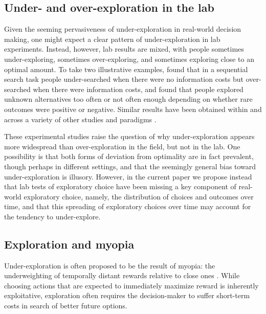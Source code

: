 \documentclass[10pt,letterpaper]{article}
\begin{document}
\subsection{Under- and over-exploration in the lab}

Given the seeming pervasiveness of under-exploration in real-world decision
making, one might expect a clear pattern of under-exploration in lab
experiments. Instead, however, lab results are mixed, with people sometimes
under-exploring, sometimes over-exploring, and sometimes exploring close to an
optimal amount. To take two illustrative examples, \citet{Zwick2003} found that
in a sequential search task people under-searched when there were no information
costs but over-searched when there were information costs, and
\citet{Teodorescu2014} found that people explored unknown alternatives too often
or not often enough depending on whether rare outcomes were positive or
negative. Similar results have been obtained within and across a variety of
other studies and paradigms
\citep{tversky1966information, Busemeyer1988, hertwig2004decisions, Navarro2016, Juni2016, Sang2011}.

These experimental studies raise the question of why under-exploration appears
more widespread than over-exploration in the field, but not in the lab. One
possibility is that both forms of deviation from optimality are in fact
prevalent, though perhaps in different settings, and that the seemingly general bias
toward under-exploration is illusory. However, in the current paper we propose
instead that lab tests of exploratory choice have been missing a key component
of real-world exploratory choice, namely, the distribution of choices and
outcomes over time, and that this spreading of exploratory choices over time may
account for the tendency to under-explore.


\subsection{Exploration and myopia}

Under-exploration is often proposed to be the result of myopia: the
underweighting of temporally distant rewards relative to close ones \cite{March1991, Levinthal1993}. While
choosing actions that are expected to immediately maximize reward is inherently
exploitative, exploration often requires the decision-maker to suffer short-term
costs in search of better future options.
\end{document}
